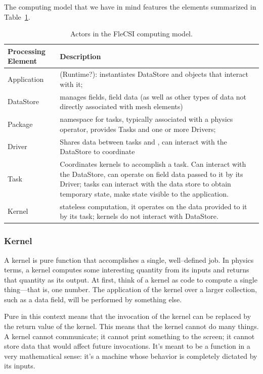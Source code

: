 The computing model that we have in mind features the elements summarized in Table~\ref{flecsi_actors_table}.
\begin{table}[hbt]
\begin{tabular}{l p{5 in}}
\toprule
Processing Element & Description \\
\midrule
Application & (Runtime?): instantiates DataStore and objects that interact with it;\\
DataStore &  manages fields, field data (as well as other types of data not directly associated with mesh elements)\\
Package &  namespace for tasks, typically associated with a physics operator, provides Tasks and one or more Drivers;\\
Driver &  Shares data between tasks and , can interact with the DataStore to coordinate \\
Task &  Coordinates kernels to accomplish a task. Can interact with the DataStore, can operate on field data passed to it by its Driver; tasks can interact with the data store to obtain temporary state, make state visible to the application.\\
Kernel &  stateless computation, it operates on the data provided to it by its task; kernels do not interact with DataStore.\\
\bottomrule
\end{tabular}
\centering
\parbox{5in}{\caption{Actors in the FleCSI computing model.\label{flecsi_actors_table}}}
\end{table}

\subsubsection{Kernel}
A kernel is pure function that accomplishes a single, well--defined job.
In physics terms, a kernel computes some interesting quantity from its inputs and returns that quantity as its output.
At first, think of a kernel as code to compute a single thing---that is, one number.
The application of the kernel over a larger collection, such as a data field, will be performed by something else.

Pure in this context means that the invocation of the kernel can be replaced by the return value of the kernel.
This means that the kernel cannot do many things.
A kernel cannot communicate; it cannot print something to the screen; it cannot store data that would affect future invocations.
It's meant to be a function in a very mathematical sense: it's a machine whose behavior is completely dictated by its inputs.


